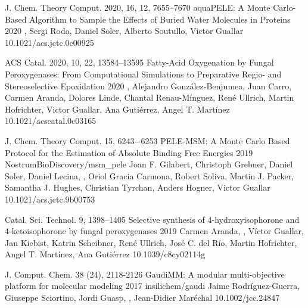 

\begin{cventries}

  \pubentry
    {J. Chem. Theory Comput. 2020, 16, 12, 7655–7670} %
    {aquaPELE: A Monte Carlo-Based Algorithm to Sample the Effects of Buried Water Molecules in Proteins} %
    {2020} %
    {} %
    {, Sergi Roda, Daniel Soler, Alberto Soutullo, Victor Guallar} %
    {} %
    {10.1021/acs.jctc.0c00925} %

  \pubentry
    {ACS Catal. 2020, 10, 22, 13584–13595} %
    {Fatty-Acid Oxygenation by Fungal Peroxygenases: From Computational Simulations to Preparative Regio- and Stereoselective Epoxidation} %
    {2020} %
    {} %
    {, Alejandro González-Benjumea, Juan Carro, Carmen Aranda, Dolores Linde, Chantal Renau-Mínguez, René Ullrich, Martin Hofrichter, Victor Guallar, Ana Gutiérrez, Angel T. Martínez} %
    {} %
    {10.1021/acscatal.0c03165} %

  \pubentry
    {J. Chem. Theory Comput. 15, 6243−6253} %
    {PELE-MSM: A Monte Carlo Based Protocol for the Estimation of Absolute Binding Free Energies} %
    {2019} %
    {NostrumBioDiscovery/msm\_pele} %
    {Joan F. Gilabert, Christoph Grebner, Daniel Soler, Daniel Lecina, , Oriol Gracia Carmona, Robert Soliva, Martin J. Packer, Samantha J. Hughes, Christian Tyrchan, Anders Hogner, Victor Guallar} %
    {} %
    {10.1021/acs.jctc.9b00753} %

  \pubentry
    {Catal. Sci. Technol. 9, 1398–1405} %
    {Selective synthesis of 4-hydroxyisophorone and 4-ketoisophorone by fungal peroxygenases} %
    {2019} %
    {} %
    {Carmen Aranda, , Víctor Guallar, Jan Kiebist, Katrin Scheibner, René Ullrich, José C. del Río, Martin Hofrichter,
Angel T. Martínez, Ana Gutiérrez} %
    {} %
    {10.1039/c8cy02114g} %

  \pubentry
    {J. Comput. Chem. 38 (24), 2118-2126} %
    {GaudiMM: A modular multi-objective platform for molecular modeling} %
    {2017} %
    {insilichem/gaudi} %
    {Jaime Rodríguez-Guerra, Giuseppe Sciortino, Jordi Guasp, , Jean-Didier Maréchal} %
    {} %
    {10.1002/jcc.24847} %

\end{cventries}
